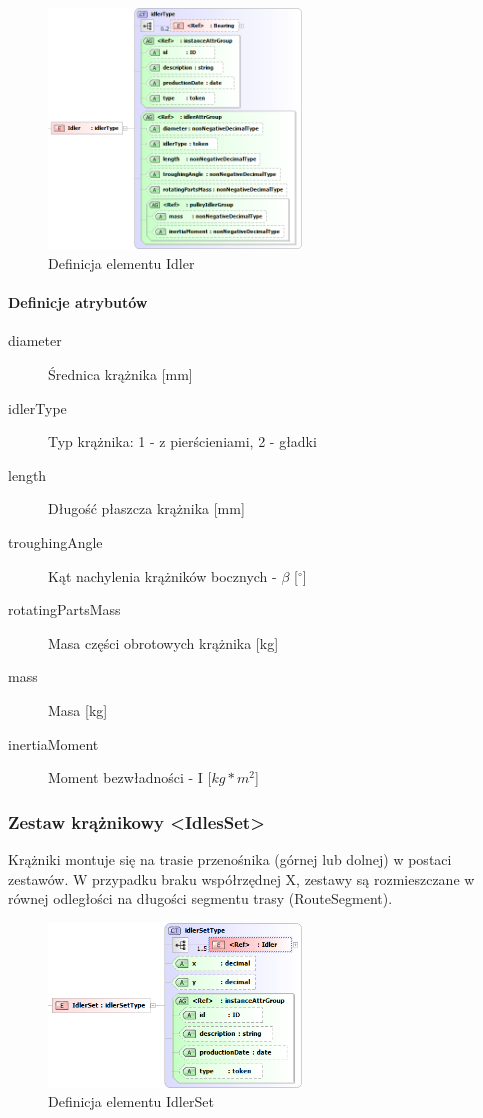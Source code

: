 \documentclass[12pt,a4paper]{article}
\begin{document}
\begin{figure}[h]
  \centering
  \includegraphics[width=0.6\textwidth]{png/liquid/Idler}
  \caption{Definicja elementu Idler}
  \label{fig:idler-xsd}
\end{figure}

\paragraph{Definicje atrybutów}
\begin{description}
\item[diameter] Średnica krążnika [mm]
\item[idlerType] Typ krążnika: 1 - z pierścieniami, 2 - gładki
\item[length] Długość płaszcza krążnika [mm]
\item[troughingAngle] Kąt nachylenia krążników bocznych - $\beta$ [$^\circ$] %
\item[rotatingPartsMass] Masa części obrotowych krążnika [kg]
\item[mass] Masa [kg]
\item[inertiaMoment] Moment bezwładności - I [$kg*m^2$]
\end{description}


\subsubsection{Zestaw krążnikowy <IdlesSet>}
Krążniki montuje się na trasie przenośnika (górnej lub dolnej) w postaci zestawów. W przypadku
braku współrzędnej X, zestawy są rozmieszczane w równej odległości na długości segmentu trasy
(RouteSegment).

\begin{figure}[h]
  \centering
  \includegraphics[width=0.6\textwidth]{png/liquid/IdlerSet}
  \caption{Definicja elementu IdlerSet}
  \label{fig:idlerSet-xsd}
\end{figure}
\end{document}
